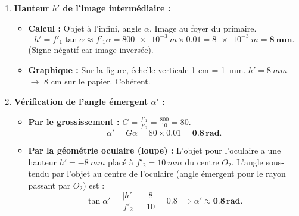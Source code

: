 \documentclass[11pt]{article}
\begin{document}
\begin{exoresolu}
\begin{enumerate}
\begin{itemize}
        \item \textbf{Oculaire (vertical) :} Placé au-dessus du secondaire. Son centre optique $O_2$ sur le rayon axial dévié. Son foyer objet $F_{o2}$ à $\SI{10}{mm}$ en dessous de $O_2$ (donc confondu avec le plan de $B'$).
        \item \textbf{Émergence :} Depuis $B'$ (hauteur $-\SI{8}{mm}$ par rapport à l'axe oculaire) :
            \begin{itemize}
                \item Rayon $B'O_2$ $\rightarrow$ sort non dévié.
                \item Rayon depuis $B'$ parallèle à l'axe oculaire $\rightarrow$ réfracté vers $F'_2$ (foyer image oculaire, $\SI{10}{mm}$ au-dessus de $O_2$).
            \end{itemize}
        \item Les deux rayons émergents sont \textbf{parallèles}, inclinés vers le haut. Angle émergent $\alpha'$.
    \end{itemize}
    \item \textbf{Hauteur $h'$ de l'image intermédiaire :}
    \begin{itemize}
        \item \textbf{Calcul :} Objet à l'infini, angle $\alpha$. Image au foyer du primaire.
        \[
        h' = f'_1 \tan\alpha \approx f'_1 \alpha = \SI{800e-3}{m} \times \num{0,01} = \SI{8e-3}{m} = \mathbf{\SI{8}{mm}}.
        \]
        (Signe négatif car image inversée).
        \item \textbf{Graphique :} Sur la figure, échelle verticale 1 cm = \SI{1}{mm}. $h' = \SI{8}{mm}$ $\rightarrow$ 8 cm sur le papier. Cohérent.
    \end{itemize}
    \item \textbf{Vérification de l'angle émergent $\alpha'$ :}
    \begin{itemize}
        \item \textbf{Par le grossissement :} $G = \frac{f'_1}{f'_2} = \frac{800}{10} = 80$.
        \[
        \alpha' = G \alpha = 80 \times \num{0,01} = \mathbf{\num{0,8}\,rad}.
        \]
        \item \textbf{Par la géométrie oculaire (loupe) :} L'objet pour l'oculaire a une hauteur $h' = -\SI{8}{mm}$ placé à $f'_2 = \SI{10}{mm}$ du centre $O_2$.
        L'angle sous-tendu par l'objet au centre de l'oculaire (angle émergent pour le rayon passant par $O_2$) est :
        \[
        \tan\alpha' = \frac{|h'|}{f'_2} = \frac{8}{10} = \num{0,8} \implies \alpha' \approx \mathbf{\num{0,8}\,rad}.
\]
\end{itemize}
\end{enumerate}
\end{exoresolu}
\end{document}
